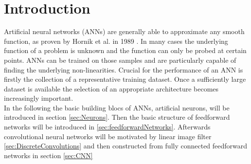 

\section{Introduction}

Artificial neural networks (ANNs) are generally able to approximate any smooth function, as proven by Hornik et al. in 1989 \cite{Hornik1989}. In many cases the underlying function of a problem is unknown and the function can only be probed at certain points. ANNs can be trained on those samples and are particularly capable of finding the underlying non-linearities. Crucial for the performance of an ANN is firstly the collection of a representative training dataset. Once a sufficiently large dataset is available the selection of an appropriate architecture becomes increasingly important. \\

In the following the basic building blocs of ANNs, artificial neurons, will be introduced in section \ref{sec:Neurons}. Then the basic structure of feedforward networks will be introduced in \ref{sec:feedforwardNetworks}. Afterwards convolutional neural networks will be motivated by linear image filter \ref{sec:DiscreteConvolutions} and then constructed from fully connected feedforward networks in section \ref{sec:CNN}


